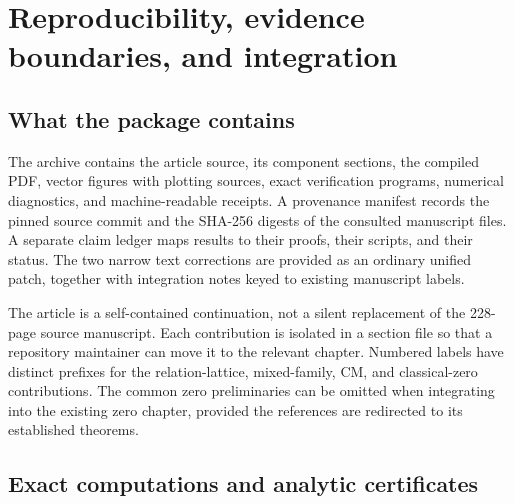 \section{Reproducibility, evidence boundaries, and integration}
\label{app:reproducibility}

\subsection{What the package contains}

The archive contains the article source, its component sections, the
compiled PDF, vector figures with plotting sources, exact verification
programs, numerical diagnostics, and machine-readable receipts. A
provenance manifest records the pinned source commit and the SHA-256
digests of the consulted manuscript files. A separate claim ledger maps
results to their proofs, their scripts, and their status. The two narrow
text corrections are provided as an ordinary unified patch, together with
integration notes keyed to existing manuscript labels.

The article is a self-contained continuation, not a silent replacement
of the 228-page source manuscript. Each contribution is isolated in a
section file so that a repository maintainer can move it to the relevant
chapter. Numbered labels have distinct prefixes for the relation-lattice,
mixed-family, CM, and classical-zero contributions. The common zero
preliminaries can be omitted when integrating into the existing zero
chapter, provided the references are redirected to its established
theorems.

\subsection{Exact computations and analytic certificates}

